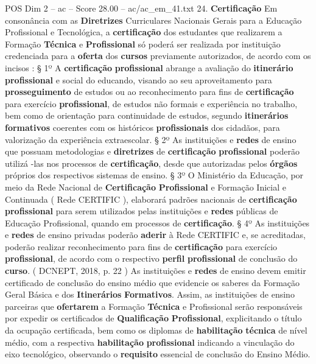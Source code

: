 \begin{textsample}{POS Dim 2 – ac – Score 28.00 – ac/ac\_em\_41.txt}  \label{ex:f2_pos_163}
24. \textbf{Certificação} Em consonância com as \textbf{Diretrizes} Curriculares Nacionais Gerais para a Educação Profissional e Tecnológica, a \textbf{certificação} dos estudantes que realizarem a Formação \textbf{Técnica} e \textbf{Profissional} só poderá ser realizada por instituição credenciada para a \textbf{oferta} dos \textbf{cursos} previamente autorizados, de acordo com os incisos : § 1º A \textbf{certificação} \textbf{profissional} abrange a avaliação do \textbf{itinerário} \textbf{profissional} e social do educando, visando ao seu aproveitamento para \textbf{prosseguimento} de estudos ou ao reconhecimento para fins de \textbf{certificação} para exercício \textbf{profissional}, de estudos não formais e experiência no trabalho, bem como de orientação para continuidade de estudos, segundo \textbf{itinerários} \textbf{formativos} coerentes com os históricos \textbf{profissionais} dos cidadãos, para valorização da experiência extraescolar. § 2º As instituições e \textbf{redes} de ensino que possuam metodologias e \textbf{diretrizes} de \textbf{certificação} \textbf{profissional} poderão utilizá -las nos processos de \textbf{certificação}, desde que autorizadas pelos \textbf{órgãos} próprios dos respectivos sistemas de ensino. § 3º O Ministério da Educação, por meio da Rede Nacional de \textbf{Certificação} \textbf{Profissional} e Formação Inicial e Continuada ( Rede CERTIFIC ), elaborará padrões nacionais de \textbf{certificação} \textbf{profissional} para serem utilizados pelas instituições e \textbf{redes} públicas de Educação Profissional, quando em processos de \textbf{certificação}. § 4º As instituições e \textbf{redes} de ensino privadas poderão \textbf{aderir} à Rede CERTIFIC e, se acreditadas, poderão realizar reconhecimento para fins de \textbf{certificação} para exercício \textbf{profissional}, de acordo com o respectivo \textbf{perfil} \textbf{profissional} de conclusão do \textbf{curso}. ( DCNEPT, 2018, p. 22 ) As instituições e \textbf{redes} de ensino devem emitir certificado de conclusão do ensino médio que evidencie os saberes da Formação Geral Básica e dos \textbf{Itinerários} \textbf{Formativos}.
Assim, as instituições de ensino parceiras que \textbf{ofertarem} a Formação \textbf{Técnica} e Profissional serão responsáveis por expedir os certificados de \textbf{Qualificação} \textbf{Profissional}, explicitando o título da ocupação certificada, bem como os diplomas de \textbf{habilitação} \textbf{técnica} de nível médio, com a respectiva \textbf{habilitação} \textbf{profissional} indicando a vinculação do eixo tecnológico, observando o \textbf{requisito} essencial de conclusão do Ensino Médio.

\end{textsample}

